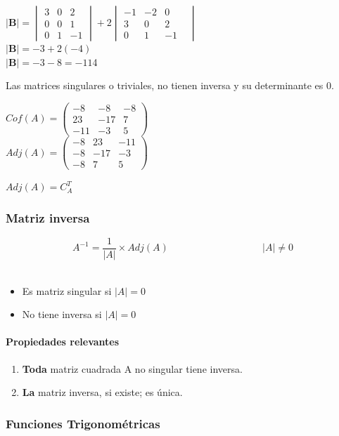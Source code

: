 \documentclass[stu, 12pt, letterpaper, donotrepeattitle, floatsintext, natbib]{apa7}
\begin{document}
\begin{itemize}
$\textbf{|B|}= \begin{vmatrix} 3 & 0 & 2 \\ 0 & 0 & 1 \\ 0 & 1 & -1 \end{vmatrix}
+
2 \begin{vmatrix} -1 & -2 & 0 & \\ 3 & 0 & 2 \\ 0 & 1 & -1 \end{vmatrix}
$\\[0.5cm]
$\textbf{|B|} = -3 + 2(-4)$\\[0.5cm]
$\textbf{|B|} = -3-8 = -11 $4
\end{itemize}

Las matrices singulares o triviales, no tienen inversa y su determinante es 0.\\[0.5cm]
\begin{paracol}{2}
$
{Cof}(A)= \begin{pmatrix} -8 & -8 & -8 \\ 23 & -17 & 7 \\ -11 & -3 & 5 \end{pmatrix}$\\
\vspace{0.5cm}
$
{Adj}(A)=\begin{pmatrix} -8 & 23 & -11 \\ -8 & -17 & -3 \\ -8 & 7 & 5 \end{pmatrix}
$

\switchcolumn
${Adj}(A)=C_A^T$
\end{paracol}

\subsubsection{Matriz inversa}
$$A^{-1}=\frac{1}{|A|} \times {Adj}(A) \hspace{4cm} |A|\neq 0 $$\\[0.5cm]
\begin{itemize}
\item Es matriz singular si $|A|=0$
\item No tiene inversa si $|A|=0$
\end{itemize}

\paragraph{Propiedades relevantes}
\begin{enumerate}
\item \textbf{Toda} matriz cuadrada A no singular tiene inversa.
\item \textbf{La} matriz inversa, si existe; es única.
\end{enumerate}

\newpage

\subsubsection{Funciones Trigonométricas}






\newpage
\renewcommand\refname{\large\textbf{Referencias}}

\end{document}
